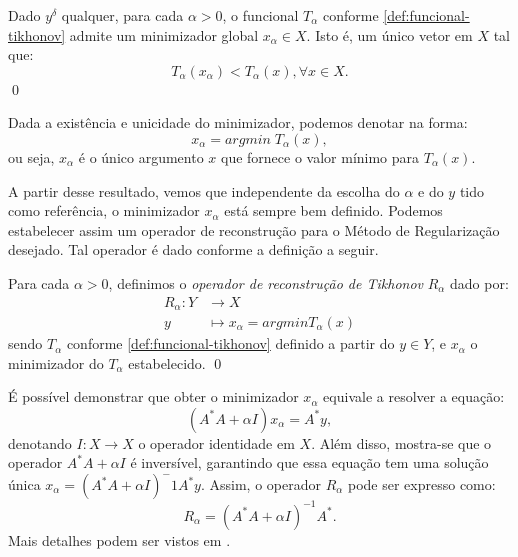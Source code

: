\begin{prop}
    Dado $y^\delta$ qualquer, para cada $\alpha>0$, o funcional $T_\alpha$ conforme \eqref{def:funcional-tikhonov} admite um minimizador global $x_\alpha \in X$. Isto é, um único vetor em $X$ tal que:
    \begin{equation*}
        T_\alpha(x_\alpha) < T_\alpha(x), \forall x \in X.
    \end{equation*} \qed
\end{prop}
\begin{obs}
    Dada a existência e unicidade do minimizador, podemos denotar na forma: 
    \begin{equation*}
        x_\alpha = argmin \; T_\alpha(x),
    \end{equation*}
    ou seja, $x_\alpha$ é o único argumento $x$ que fornece o valor mínimo para $T_\alpha(x)$.
\end{obs}

A partir desse resultado, vemos que independente da escolha do $\alpha$ e do $y$ tido como referência, o minimizador $x_\alpha$ está sempre bem definido. Podemos estabelecer assim um operador de reconstrução para o Método de Regularização desejado. Tal operador é dado conforme a definição a seguir.

\begin{defin} \label{def:operador-tikhonov}
    Para cada $\alpha>0$, definimos o \textit{operador de reconstrução de Tikhonov} $R_\alpha$ dado por:
    \begin{align*}
        R_\alpha : Y &\to X \\
        y &\mapsto x_\alpha = argmin T_\alpha(x)
    \end{align*}
    sendo $T_\alpha$ conforme \ref{def:funcional-tikhonov} definido a partir do $y \in Y$, e $x_\alpha$ o minimizador do $T_\alpha$ estabelecido. \qed
\end{defin}

\begin{obs}
    É possível demonstrar que obter o minimizador $x_\alpha$ equivale a resolver a equação:
    \begin{equation}
        (A^*A + \alpha I) x_\alpha = A^* y,
    \end{equation}
    denotando $I:X \to X$ o operador identidade em $X$. Além disso, mostra-se que o operador $A^*A + \alpha I$ é inversível, garantindo que essa equação tem uma solução única  $x_\alpha = (A^*A + \alpha I)^-1 A^* y$. Assim, o operador $R_\alpha$ pode ser expresso como:
    \begin{equation*}
        R_\alpha = (A^*A + \alpha I)^{-1}A^*.
    \end{equation*}
    Mais detalhes podem ser vistos em \cite{kirsch}.
\end{obs}

